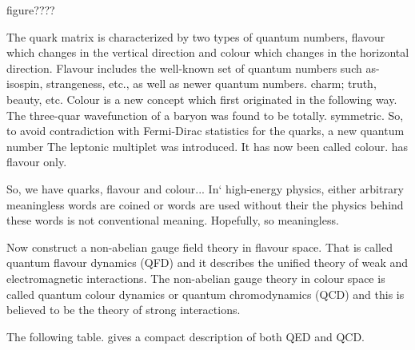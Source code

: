 figure????

The quark matrix is characterized by two types of quantum numbers, flavour which changes in the vertical direction and colour which changes in the horizontal direction. Flavour includes the well-known set of
quantum numbers such as- isospin, strangeness, etc., as well as newer 
quantum numbers. charm; truth, beauty, etc. Colour is a new concept 
which first originated in the following way. The three-quar wavefunction 
of a baryon was found to be totally. symmetric. So, to avoid contradiction with Fermi-Dirac statistics for the quarks, a new quantum number The leptonic multiplet was introduced. It has now been called colour.
has flavour only. 

So, we have quarks, flavour and colour... In‘ high-energy physics, either
arbitrary meaningless words are coined or words are used without their
the physics behind these words is not conventional meaning. Hopefully,
so meaningless. 

Now construct a non-abelian gauge field theory in flavour space. That 
is called quantum flavour dynamics (QFD) and it describes the unified 
theory of weak and electromagnetic interactions. The non-abelian gauge
theory in colour space is called quantum colour dynamics or quantum
chromodynamics (QCD) and this is believed to be the theory of strong 
interactions. 

The following table. gives a compact description of both QED and QCD. 

